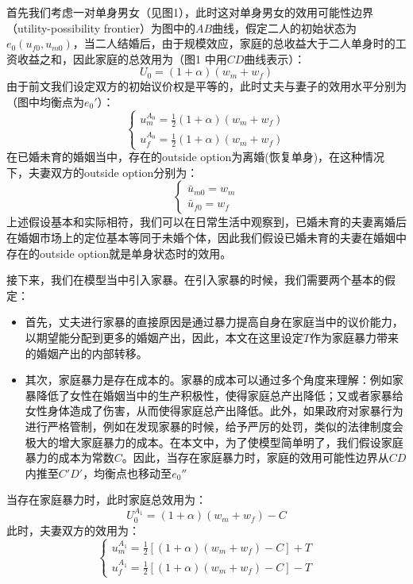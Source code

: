 \documentclass[a4paper,zihao=-4,UTF8]{ctexart}
\begin{document}
	首先我们考虑一对单身男女（见图1），此时这对单身男女的效用可能性边界（utility-possibility frontier）为图中的$AB$曲线，假定二人的初始状态为$e_0(u_{f0},u_{m0})$，当二人结婚后，由于规模效应，家庭的总收益大于二人单身时的工资收益之和，因此家庭的总效用为（图1 中用$CD$曲线表示）：
	\begin{equation}
		U_0 = (1+\alpha)(w_m+w_f)
	\end{equation}
	由于前文我们设定双方的初始议价权是平等的，此时丈夫与妻子的效用水平分别为（图中均衡点为$e_0'$）：
	\begin{equation}
		\left\{
		\begin{array}{lr}
			u_m^{A_0} = \frac{1}{2}(1+\alpha)(w_m+w_f) \\
			u_f^{A_0} =  \frac{1}{2}(1+\alpha)(w_m+w_f)
		\end{array}
		\right.
	\end{equation}
	在已婚未育的婚姻当中，存在的outside option为离婚(恢复单身)，在这种情况下，夫妻双方的outside option分别为：
	\begin{equation}
		\left\{
		\begin{array}{lr}
			\bar{u}_{m0} = w_m \\
			\bar{u}_{f0}= w_f
		\end{array}
		\right.
	\end{equation}
	上述假设基本和实际相符，我们可以在日常生活中观察到，已婚未育的夫妻离婚后在婚姻市场上的定位基本等同于未婚个体，因此我们假设已婚未育的夫妻在婚姻中存在的outside option就是单身状态时的效用。
	
	接下来，我们在模型当中引入家暴。在引入家暴的时候，我们需要两个基本的假定：
	\begin{itemize}
		\item 首先，丈夫进行家暴的直接原因是通过暴力提高自身在家庭当中的议价能力，以期望能分配到更多的婚姻产出，因此，本文在这里设定$T$作为家庭暴力带来的婚姻产出的内部转移。
		\item 其次，家庭暴力是存在成本的。家暴的成本可以通过多个角度来理解：例如家暴降低了女性在婚姻当中的生产积极性，使得家庭总产出降低；又或者家暴给女性身体造成了伤害，从而使得家庭总产出降低。此外，如果政府对家暴行为进行严格管制，例如在发现家暴的时候，给予严厉的处罚，类似的法律制度会极大的增大家庭暴力的成本。在本文中，为了使模型简单明了，我们假设家庭暴力的成本为常数$C$。因此，当存在家庭暴力时，家庭的效用可能性边界从$CD$内推至$C'D'$，均衡点也移动至$e_0''$
	\end{itemize}
	当存在家庭暴力时，此时家庭总效用为：
		\begin{equation}
		U_0^{A_1} = (1+\alpha)(w_m+w_f)-C
	\end{equation}
	此时，夫妻双方的效用为：
	\begin{equation}
	\left\{
	\begin{array}{lr}
		u_m^{A_1} = \frac{1}{2}[(1+\alpha)(w_m+w_f)-C]+T \\
		u_f^{A_1} =  \frac{1}{2}[(1+\alpha)(w_m+w_f)-C]-T 
	\end{array}
	\right.
\end{equation}
\end{document}
